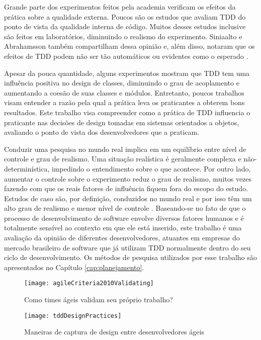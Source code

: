 Grande parte dos experimentos feitos pela academia verificam os
efeitos da prática sobre a qualidade externa. Poucos são os estudos que avaliam TDD do
ponto de vista da qualidade interna de código. Muitos desses estudos
inclusive são feitos em laboratórios, diminuindo o realismo do experimento. 
Siniaalto e Abrahamsson também
compartilham dessa opinião e, além disso, notaram que os efeitos de TDD podem 
não ser tão automáticos ou evidentes como o esperado \cite{alarming-results}.

Apesar da pouca quantidade, alguns experimentos mostram que TDD tem uma influência
positiva no design de classes, diminuindo o grau de acoplamento e aumentando
a coesão de suas classes e módulos. Entretanto, poucos trabalhos visam
entender a razão pela qual a prática leva os praticantes a obterem bons resultados.
Este trabalho visa compreender como a prática de TDD influencia o praticante
nas decisões de design tomadas em sistemas orientados a objetos, 
avaliando o ponto de vista dos desenvolvedores que a praticam.

Conduzir uma pesquisa no mundo real implica em um equilíbrio entre
nível de controle e grau de realismo. Uma situação realística é geralmente complexa e 
não-determinística, impedindo o entendimento sobre o que acontece. Por outro
lado, aumentar o controle sobre o experimento reduz o grau de realismo, muitos
vezes fazendo com que os reais fatores de influência fiquem fora do escopo do 
estudo. Estudos de caso são, por definição, conduzidos no mundo real e por isso 
têm um alto grau de realismo e menor nível de controle
\cite{guidelines-case-study}.
Baseando-se no fato de que o processo de desenvolvimento de software envolve 
diversos fatores humanos e é totalmente sensível ao contexto em que ele está 
inserido, este trabalho é uma avaliação da opinião de diferentes desenvolvedores, 
atuantes em
empresas do mercado brasileiro de software que já utilizam TDD normalmente
dentro do seu ciclo de desenvolvimento. Os métodos de pesquisa utilizados por
esse trabalho são apresentados no Capítulo \ref{cap:planejamento}.

\begin{figure}[ht]
  \begin{minipage}[b]{0.45\linewidth}
    \centering
    \texttt{[image: agileCriteria2010Validating]}
    \caption{Como times ágeis validam seu próprio trabalho?}
    \label{fig:wambler-agile-2010}
  \end{minipage}
  \hspace{0.5cm}
  \begin{minipage}[b]{0.45\linewidth}
    \centering
    \texttt{[image: tddDesignPractices]}
    \caption{Maneiras de captura de design entre desenvolvedores ágeis}  
    \label{fig:wambler-tdd-2008}
  \end{minipage}
\end{figure}			

